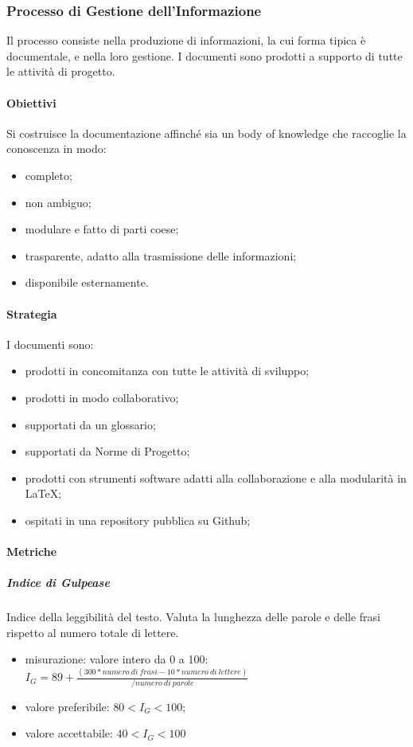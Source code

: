 	\subsubsection{Processo di Gestione dell'Informazione}
	Il processo consiste nella produzione di informazioni, la cui forma tipica è  documentale, e nella loro gestione. I documenti sono prodotti a supporto di tutte le attività di progetto.
		\paragraph{Obiettivi}
			Si costruisce la documentazione affinché sia un body of knowledge %
			che raccoglie la conoscenza in modo:
			\begin{itemize}
				\item completo;
				\item non ambiguo;
				\item modulare e fatto di parti coese;
				\item trasparente, adatto alla trasmissione delle informazioni;
				\item disponibile esternamente.
			\end{itemize}
		\paragraph{Strategia}
		I documenti sono:
		\begin{itemize}
			\item prodotti in concomitanza con tutte le attività di sviluppo;
			\item prodotti in modo collaborativo;
			\item supportati da un glossario;
			\item supportati da Norme di Progetto;
			\item prodotti con strumenti software adatti alla collaborazione e alla modularità in \LaTeX{};
			\item ospitati in una repository pubblica su Github;
		\end{itemize}
		\paragraph{Metriche}
			\subparagraph{Indice di Gulpease}
			Indice della leggibilità del testo. Valuta la lunghezza delle parole e delle frasi rispetto al numero totale di lettere. 
			\begin{itemize}
				\item misurazione: valore intero da 0 a 100:\newline 	
				$I_G = 89+ \frac{(300 * numero\ di\ frasi - 10 * numero\ di\ lettere)}{/numero\ di\ parole}$	
				\item valore preferibile: $80 < I_G < 100$;
				\item valore accettabile: $40 < I_G < 100$	
			\end{itemize}
		
